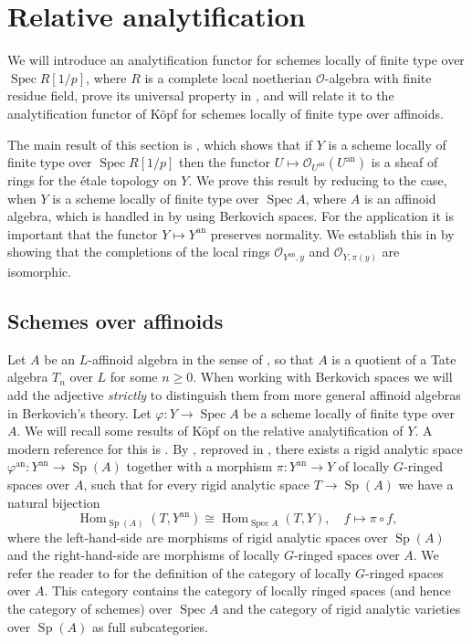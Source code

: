 \documentclass{amsart}
\theoremstyle{definition}
\theoremstyle{remark}
\DeclareMathOperator{\Hom}{Hom}
\DeclareMathOperator{\Spec}{Spec}
\DeclareMathOperator{\Sp}{Sp}
\newcommand{\OO}{\mathcal O}
\newcommand{\ana}{\mathrm{an}}
\begin{document}
\section{Relative analytification}\label{sec_rel_an}
We will introduce an analytification functor for schemes 
locally of finite type over $\Spec R[1/p]$, where $R$ is a complete local noetherian $\OO$-algebra with finite residue field, prove its universal 
property in ,  and will relate it 
to the analytification functor of K\"opf for schemes  
locally of finite type over affinoids. 

The main result of this section is , which shows that if $Y$ is a scheme locally of finite type over $\Spec R[1/p]$ then the functor
$U\mapsto \OO_{U^{\ana}}(U^{\ana})$ is a sheaf 
of rings for the \'etale topology on $Y$. We prove this result by reducing to the case, when
$Y$ is a scheme locally of finite type over
$\Spec A$, where $A$ is an affinoid algebra,
which is handled in  by 
using Berkovich spaces. For the application 
it is important that the functor $Y\mapsto Y^{\ana}$ 
preserves normality. We establish this in  
by showing that the completions of the local rings $\OO_{Y^{\ana},y}$ 
and $\OO_{Y, \pi(y)}$
are isomorphic. 
\subsection{Schemes over affinoids}
Let $A$ be an $L$-affinoid algebra in the sense of \cite[Definition 6.1.1/1]{BGR}, so that $A$ is 
a quotient of a Tate algebra $T_n$ over $L$ for 
some $n\ge 0$. When working with 
Berkovich spaces we will add the adjective 
\textit{strictly} to distinguish them from more general affinoid algebras in Berkovich's theory. Let $\varphi: Y \rightarrow \Spec A$ 
be a scheme locally of finite type over $A$. We will recall some
results of K\"opf \cite{Koepf} on the relative analytification of $Y$. 
A modern reference for this is \cite[Section 2]{conrad_ample}. 
By \cite[Satz 1.4]{Koepf}, reproved in \cite[Example 2.2.11]{conrad_ample}, there 
exists a rigid analytic space $\varphi^{\ana}: Y^{\ana} \rightarrow \Sp(A)$ together with a morphism $\pi: Y^{\ana}\rightarrow Y$ of 
locally $G$-ringed  spaces over $A$, such that for every 
rigid analytic space $T\rightarrow \Sp(A)$ we have a natural 
bijection 
\begin{equation}\label{universal_koepf}
\Hom_{\Sp(A)}(T, Y^{\ana})\cong \Hom_{\Spec A}(T, Y), \quad f \mapsto \pi\circ f,
\end{equation}
where the left-hand-side are morphisms of rigid analytic spaces over 
$\Sp(A)$ and the right-hand-side are morphisms of locally $G$-ringed  spaces over $A$. We refer the reader to \cite[Definition 2.2.2]{conrad_ample} for the definition of the category of locally $G$-ringed  spaces over $A$. This category contains the category of 
locally ringed spaces (and hence the category of schemes) over $\Spec A$ and the category of rigid analytic varieties over $\Sp(A)$ as full subcategories. 
\end{document}
